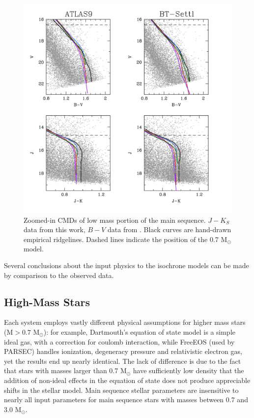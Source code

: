 \documentclass[iop]{emulateapj}
\begin{document}
\begin{figure} \centering
\includegraphics[trim = 0mm 20mm 20mm 0mm, clip, width=4.5in]{fig6.png}		%
\caption{Zoomed-in CMDs of low mass portion of the main sequence. $J-K_S$ data from this work, $B-V$ data from \citet{2003AJ....126.1402K}. Black curves are hand-drawn empirical ridgelines. Dashed lines indicate the position of the 0.7 M$_\odot$ model. \label{fig:isocompare-zoomed}}
\end{figure}

Several conclusions about the input physics to the isochrone models can be made by comparison to the observed data.

\subsection{High-Mass Stars}
Each system employs vastly different physical assumptions for higher mass stars (M$>0.7$ M$_\odot$): for example, Dartmouth's equation of state model is a simple ideal gas, with a correction for coulomb interaction, while FreeEOS (used by PARSEC) handles ionization, degeneracy pressure and relativistic electron gas, yet the results end up nearly identical. The lack of difference is due to the fact that stars with masses larger than 0.7 M$_\odot$ have sufficiently low density that the addition of non-ideal effects in the equation of state does not produce appreciable shifts in the stellar model. Main sequence stellar parameters are insensitive to nearly all input parameters for main sequence stars with masses between 0.7 and 3.0 M$_\odot$.
\end{document}

